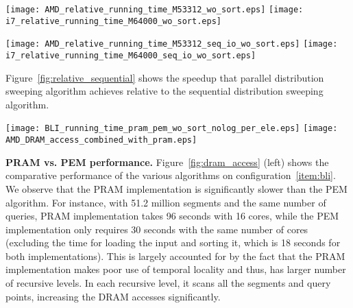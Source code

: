 \begin{figure*}[!htb]
\center
\texttt{[image: AMD\_relative\_running\_time\_M53312\_wo\_sort.eps]}
\hspace{1cm}
\texttt{[image: i7\_relative\_running\_time\_M64000\_wo\_sort.eps]}
\caption{Speedup of the distribution sweeping algorithms relative to the plane
sweep algorithm on the configuration~\ref{item:amd} (left) and configuration~\ref{item:intel} (right). The
plots exclude the times to perform initial sorting of inputs by the
-coordinate for distribution sweeping and -coordinate for the plane sweep.}
\label{fig:relative_linesweep}
\end{figure*}

\begin{figure*}[!htb]
\center
\texttt{[image: AMD\_relative\_running\_time\_M53312\_seq\_io\_wo\_sort.eps]}
\hspace{1cm}
\texttt{[image: i7\_relative\_running\_time\_M64000\_seq\_io\_wo\_sort.eps]}
\caption{Speedup of the parallel distribution sweeping algorithms relative to the sequential distribution sweeping
algorithm on configuration~\ref{item:amd} (left) and configuration~\ref{item:intel} (right) systems. The plots exclude the times to perform initial sorting of inputs by the -coordinate.}
\label{fig:relative_sequential}
\end{figure*}

Figure~\ref{fig:relative_sequential} shows the speedup that parallel
distribution sweeping algorithm achieves relative to the sequential
distribution sweeping algorithm. 

\begin{figure*}[!htb]
\center
\texttt{[image: BLI\_running\_time\_pram\_pem\_wo\_sort\_nolog\_per\_ele.eps]}
\hspace{1cm}
\texttt{[image: AMD\_DRAM\_access\_combined\_with\_pram.eps]}
\caption{Comparison of PEM and PRAM algorithms on 16 cores of
  configuration~\ref{item:bli} is shown in the left figure. Running time and DRAM
  traffic for long segments on 12 cores of configuration~\ref{item:amd}
  in the right.}
\label{fig:dram_access}
\end{figure*}

\textbf{PRAM vs. PEM performance.} Figure~\ref{fig:dram_access} (left) shows the comparative
performance of the various algorithms on configuration~\ref{item:bli}. We observe
that the PRAM implementation is significantly slower than the PEM
algorithm. For instance, with 51.2 million segments and the same
number of queries, PRAM implementation takes 96 seconds with 16
cores, while the PEM implementation only requires 30 seconds with the
same number of cores (excluding the time for loading the input and
sorting it, which is 18 seconds for both implementations). This is
largely accounted for by the fact that the PRAM implementation makes
poor use of temporal locality and thus, has larger number of recursive
levels. In each recursive level, it scans all the segments and query
points, increasing the DRAM accesses significantly. 

